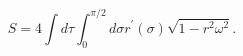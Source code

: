 \begin{equation}
S = 4 \int d\tau \int_0^{\pi/2}  d\sigma r^\prime(\sigma) \sqrt{1-r^2
\omega^2} . \label{sng}
\end{equation}

